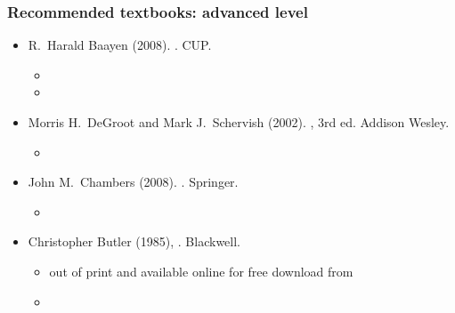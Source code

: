 \documentclass[t]{beamer} %
\begin{document}
\begin{frame}
  \frametitle{Recommended textbooks: advanced level}

  \begin{itemize}
  \item R.~Harald Baayen (2008). . CUP. \secondary{[\texteuro 20]}
    \begin{itemize}
    \item {}
    \item[]
    \end{itemize}
  \item Morris H.\ DeGroot and Mark J.\ Schervish (2002). , 3rd ed. Addison Wesley. \secondary{[\texteuro 57]}
    \begin{itemize}
    \item[]
    \end{itemize}
  \item John M.\ Chambers (2008). . Springer.
    \begin{itemize}
    \item[]
    \end{itemize}
  \item Christopher Butler (1985), . Blackwell.
    \begin{itemize}
    \item out of print and available online for free download from
    \item[]
    \end{itemize}
  \end{itemize}
\end{frame}
\end{document}
